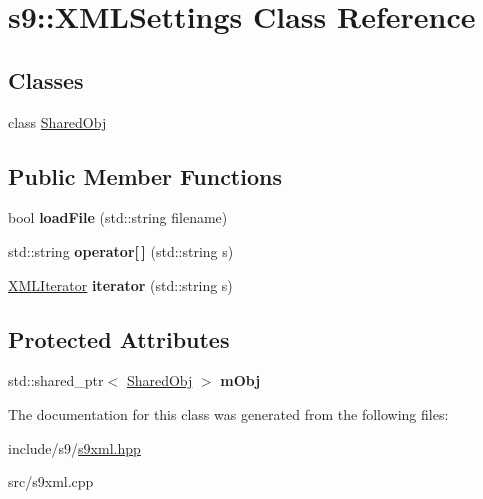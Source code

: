 \hypertarget{classs9_1_1XMLSettings}{\section{s9\-:\-:X\-M\-L\-Settings Class Reference}
\label{classs9_1_1XMLSettings}
}
\subsection*{Classes}
\begin{DoxyCompactItemize}
\item 
class \hyperlink{classs9_1_1XMLSettings_1_1SharedObj}{Shared\-Obj}
\end{DoxyCompactItemize}
\subsection*{Public Member Functions}
\begin{DoxyCompactItemize}
\item 
\hypertarget{classs9_1_1XMLSettings_a34f91250fbd58585d953909b97faa4bd}{bool {\bfseries load\-File} (std\-::string filename)}\label{classs9_1_1XMLSettings_a34f91250fbd58585d953909b97faa4bd}

\item 
\hypertarget{classs9_1_1XMLSettings_aaad33d1df91879d99afee855faa0a0dc}{std\-::string {\bfseries operator\mbox{[}$\,$\mbox{]}} (std\-::string s)}\label{classs9_1_1XMLSettings_aaad33d1df91879d99afee855faa0a0dc}

\item 
\hypertarget{classs9_1_1XMLSettings_a9b85b894b47df6268b77275332c2d9d4}{\hyperlink{classs9_1_1XMLIterator}{X\-M\-L\-Iterator} {\bfseries iterator} (std\-::string s)}\label{classs9_1_1XMLSettings_a9b85b894b47df6268b77275332c2d9d4}

\end{DoxyCompactItemize}
\subsection*{Protected Attributes}
\begin{DoxyCompactItemize}
\item 
\hypertarget{classs9_1_1XMLSettings_a791bd9646cbce5d125cb5f38605630ba}{std\-::shared\-\_\-ptr$<$ \hyperlink{classs9_1_1XMLSettings_1_1SharedObj}{Shared\-Obj} $>$ {\bfseries m\-Obj}}\label{classs9_1_1XMLSettings_a791bd9646cbce5d125cb5f38605630ba}

\end{DoxyCompactItemize}


The documentation for this class was generated from the following files\-:\begin{DoxyCompactItemize}
\item 
include/s9/\hyperlink{s9xml_8hpp}{s9xml.\-hpp}\item 
src/s9xml.\-cpp\end{DoxyCompactItemize}
